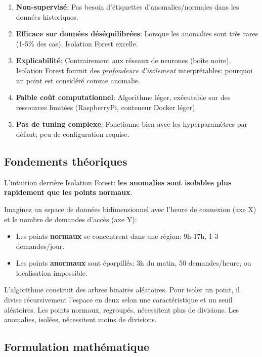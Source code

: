\begin{enumerate}
	\item \textbf{Non-supervisé}: Pas besoin d'étiquettes d'anomalies/normales dans les données historiques.
	
	\item \textbf{Efficace sur données déséquilibrées}: Lorsque les anomalies sont très rares (1-5\% des cas), Isolation Forest excelle.
	
	\item \textbf{Explicabilité}: Contrairement aux réseaux de neurones (boîte noire), Isolation Forest fournit des \textit{profondeurs d'isolement} interprétables: pourquoi un point est considéré comme anomalie.
	
	\item \textbf{Faible coût computationnel}: Algorithme léger, exécutable sur des ressources limitées (RaspberryPi, conteneur Docker léger).
	
	\item \textbf{Pas de tuning complexe}: Fonctionne bien avec les hyperparamètres par défaut; peu de configuration requise.
\end{enumerate}

\subsection{Fondements théoriques}

L'intuition derrière Isolation Forest: \textbf{les anomalies sont isolables plus rapidement que les points normaux}.

Imaginez un espace de données bidimensionnel avec l'heure de connexion (axe X) et le nombre de demandes d'accès (axe Y):
\begin{itemize}
	\item Les points \textbf{normaux} se concentrent dans une région: 9h-17h, 1-3 demandes/jour.
	\item Les points \textbf{anormaux} sont éparpillés: 3h du matin, 50 demandes/heure, ou localisation impossible.
\end{itemize}

L'algorithme construit des arbres binaires aléatoires. Pour isoler un point, il divise récursivement l'espace en deux selon une caractéristique et un seuil aléatoires. Les points normaux, regroupés, nécessitent plus de divisions. Les anomalies, isolées, nécessitent moins de divisions.

\subsection{Formulation mathématique}

